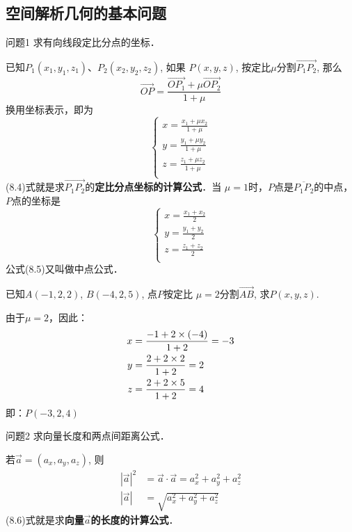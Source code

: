 \subsection{空间解析几何的基本问题}
\begin{blk}{问题1}
    求有向线段定比分点的坐标．
\end{blk}
 
已知$P_1(x_1,y_1,z_1)$、$P_2(x_2,y_2,z_2)$, 如果
$P(x,y,z)$, 按定比$\mu$分割$\Vec{P_1P_2}$, 那么
\[\Vec{OP}=\frac{\Vec{OP_1}+\mu \Vec{OP_2}}{1+\mu}\]
换用坐标表示，即为
\begin{equation}
    \begin{cases}
        x=\frac{x_1+\mu x_2}{1+\mu}\\
        y=\frac{y_1+\mu y_2}{1+\mu}\\
        z=\frac{z_1+\mu z_2}{1+\mu}\\
    \end{cases}
\end{equation}
(8.4)式就是求$\Vec{P_1P_2}$的\textbf{定比分点坐标的计算公式}．当
$\mu=1$时，$P$点是$\overline{P_1P_2}$的中点，$P$点的坐标是
\begin{equation}
    \begin{cases}
        x=\frac{x_1+ x_2}{2}\\
        y=\frac{y_1+ y_2}{2}\\
        z=\frac{z_1+ z_2}{2}\\
    \end{cases}
\end{equation}
公式(8.5)又叫做中点公式．


\begin{example}
已知$A(-1,2,2)$, $B(-4,2,5)$, 点$P$按定比
$\mu=2$分割$\Vec{AB}$, 求$P(x,y,z)$.
\end{example}

\begin{solution}
由于$\mu=2$，因此：
\[\begin{split}
    x&=\dfrac{-1+2\times (-4)}{1+2}=-3\\
    y&=\dfrac{2+2\times 2}{1+2}=2\\
    z&=\dfrac{2+2\times 5}{1+2}=4\\
\end{split}\]    
即：$P(-3,2,4)$
\end{solution}

\begin{blk}{问题2}
    求向量长度和两点间距离公式．
\end{blk}

若$\vec{a}=(a_x,a_y,a_z)$, 则
\begin{align}
    |\vec{a}|^2&=\vec{a}\cdot \vec{a} =a^2_x+a^2_y+a^2_z\nonumber\\
|\vec{a}|&=\sqrt{a^2_x+a^2_y+a^2_z}
\end{align}
(8.6)式就是求\textbf{向量$\vec{a}$的长度的计算公式}．

